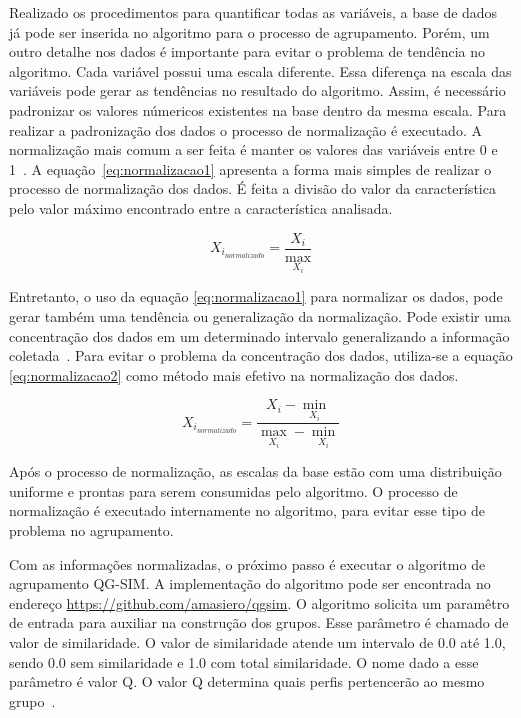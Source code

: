 Realizado os procedimentos para quantificar todas as variáveis, a base de dados já pode ser inserida no algoritmo para o processo de agrupamento. Porém, um outro detalhe nos dados é importante para evitar o problema de tendência no algoritmo. Cada variável possui uma escala diferente. Essa diferença na escala das variáveis pode gerar as tendências no resultado do algoritmo. Assim, é necessário padronizar os valores númericos existentes na base dentro da mesma escala. Para realizar a padronização dos dados o processo de normalização é executado. A normalização mais comum a ser feita é manter os valores das variáveis entre 0 e 1~\cite{lattin:2011}. A equação~\ref{eq:normalizacao1} apresenta a forma mais simples de realizar o processo de normalização dos dados. É feita a divisão do valor da característica pelo valor máximo encontrado entre a característica analisada.

\begin{equation}
	X_{i_{normalizado}} = \frac{X_i}{\max_{X_i}}
	\label{eq:normalizacao1}
\end{equation}

Entretanto, o uso da equação \ref{eq:normalizacao1} para normalizar os dados, pode gerar também uma tendência ou generalização da normalização. Pode existir uma concentração dos dados em um determinado intervalo generalizando a informação coletada~\cite{masiero:2013}. Para evitar o problema da concentração dos dados, utiliza-se a equação \ref{eq:normalizacao2} como método mais efetivo na normalização dos dados.

\begin{equation}
	X_{i_{normalizado}} = \frac{X_i - \min_{X_i}}{\max_{X_i} - \min_{X_i}}
	\label{eq:normalizacao2}
\end{equation}

Após o processo de normalização, as escalas da base estão com uma distribuição uniforme e prontas para serem consumidas pelo algoritmo. O processo de normalização é executado internamente no algoritmo, para evitar esse tipo de problema no agrupamento.

Com as informações normalizadas, o próximo passo é executar o algoritmo de agrupamento QG-SIM. A implementação do algoritmo pode ser encontrada no endereço \url{https://github.com/amasiero/qgsim}. O algoritmo solicita um paramêtro de entrada para auxiliar na construção dos grupos. Esse parâmetro é chamado de valor de similaridade. O valor de similaridade atende um intervalo de 0.0 até 1.0, sendo 0.0 sem similaridade e 1.0 com total similaridade. O nome dado a esse parâmetro é valor Q. O valor Q determina quais perfis pertencerão ao mesmo grupo~\cite{masiero:2013}.


